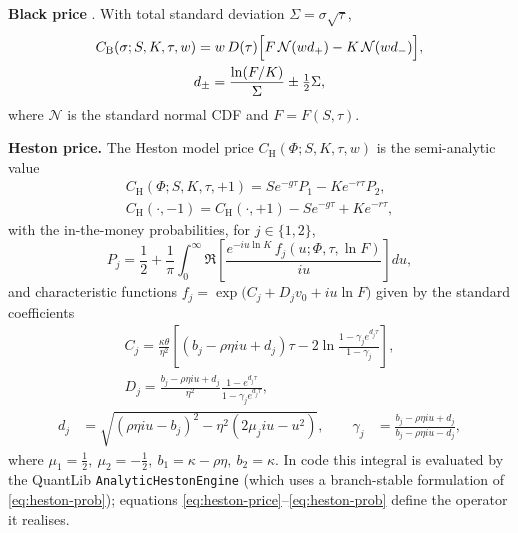 \documentclass[a4paper, 11pt, reqno]{amsart}
\begin{document}
			\textbf{Black price} \citep{black1976,blackscholes1973}. With total standard deviation $\Sigma=\sigma\sqrt{\tau}$,
			\begin{equation}\label{eq:black}
				\begin{gathered}
				C_{\mathrm{B}}(\sigma; S, K, \tau, w) = w\, D(\tau)\Bigl[ F\,\mathcal{N}(w d_+) - K\,\mathcal{N}(w d_-) \Bigr], \\
				d_\pm = \frac{\ln(F/K)}{\Sigma} \pm \tfrac{1}{2}\Sigma ,
				\end{gathered}
			\end{equation}
			where $\mathcal{N}$ is the standard normal CDF and $F=F(S,\tau)$.
		
			\textbf{Heston price.} The Heston model price $C_{\mathrm{H}}(\Phi; S,K,\tau,w)$ is
			the semi-analytic value
			\begin{equation}\label{eq:heston-price}
			\begin{gathered}
				C_{\mathrm{H}}(\Phi; S,K,\tau,+1) = S e^{-g\tau} P_1 - K e^{-r\tau} P_2, \\
				C_{\mathrm{H}}(\cdot,-1) = C_{\mathrm{H}}(\cdot,+1) - S e^{-g\tau} + K e^{-r\tau},
			\end{gathered}
			\end{equation}
			with the in-the-money probabilities, for $j\in\{1,2\}$,
			\begin{equation}\label{eq:heston-prob}
				P_j = \frac{1}{2} + \frac{1}{\pi}\int_0^\infty
				\Re\!\left[ \frac{e^{-i u \ln K}\, f_j(u; \Phi, \tau, \ln F)}{i u} \right] du ,
			\end{equation}
			and characteristic functions $f_j = \exp\bigl(C_j + D_j v_0 + i u \ln F\bigr)$ given by the standard coefficients
			\begin{equation}
				\begin{gathered}
					C_j = \frac{\kappa\theta}{\eta^2}\!\left[ (b_j - \rho\eta i u + d_j)\tau - 2\ln\!\frac{1 - \gamma_j e^{d_j\tau}}{1 - \gamma_j} \right],  \\
					D_j = \frac{b_j - \rho\eta i u + d_j}{\eta^2} \frac{1 - e^{d_j\tau}}{1 - \gamma_j e^{d_j\tau}},
				\end{gathered}
			\end{equation}
				\begin{equation}
				\begin{aligned}
					d_j &= \sqrt{(\rho\eta i u - b_j)^2 - \eta^2(2 \mu_j i u - u^2)},  \qquad \gamma_j &= \frac{b_j - \rho\eta i u + d_j}{b_j - \rho\eta i u - d_j},
				\end{aligned}
			\end{equation}
			where $\mu_1=\tfrac12,\ \mu_2=-\tfrac12,\ b_1=\kappa-\rho\eta,\ b_2=\kappa$. In code this
			integral is evaluated by the QuantLib \citep{quantlib} \texttt{AnalyticHestonEngine} (which uses a
			branch-stable formulation of \eqref{eq:heston-prob}); equations
			\eqref{eq:heston-price}--\eqref{eq:heston-prob} define the operator it realises.
		
\end{document}
